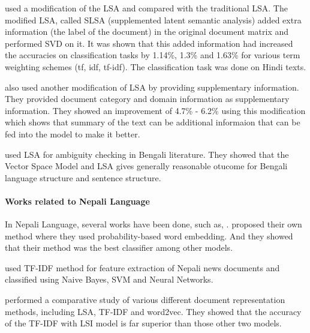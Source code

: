 \documentclass[12pt]{article}
\begin{document}
                            \cite{krishnamurthi2017including} used a modification of the LSA and compared with the traditional LSA. The modified LSA, called
                            SLSA (supplemented latent semantic analysis) added extra information (the label of the document) in the original document matrix 
                            and performed SVD on it. It was shown that this added information had increased the accuracies on classification tasks by 1.14\%, 1.3\% 
                            and 1.63\% for various term weighting schemes (tf, idf, tf-idf). The classification task was done on Hindi texts. 

                            \cite{krishnamurthi2016understanding} also used another modification of LSA by providing supplementary information. They provided 
                            document category and domain information as supplementary information. They showed an improvement of 4.7\% - 6.2\% using this modification which shows that 
                            summary of the text can be additional informaion that can be fed into the model to make it better.

                            \cite{nipu2017machine} used LSA for ambiguity checking in Bengali literature. They showed that the Vector Space Model and LSA gives generally reasonable
                            otucome for Bengali language structure and sentence structure. 
                             
                    \paragraph{Works related to Nepali Language}

                        In Nepali Language, several works have been done, such as, 
                        \cite{sitaula2021vector,shahi2018nepali,kafle2016improving,subba2019nepali,singh2018nepali}. \cite{sitaula2021vector} proposed their own method where they used probability-based
                        word embedding. And they showed that their method was the best classifier among other models. 
                        
                        \cite{shahi2018nepali} used TF-IDF method for feature extraction of Nepali news documents and classified using Naive Bayes, SVM and Neural Networks. 

                        \cite{kafle2016improving} performed a comparative study of various different document representation methods, including LSA, TF-IDF and word2vec. They showed that the accuracy
                        of the TF-IDF with LSI model is far superior than those other two models. 
\end{document}
